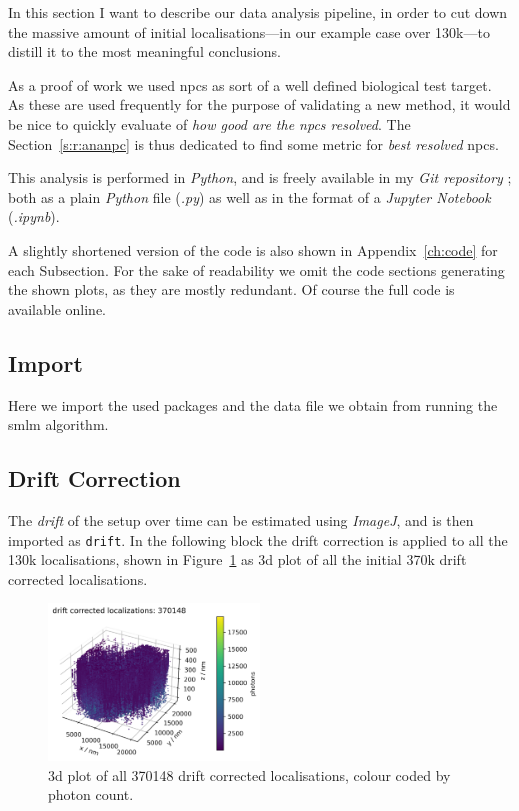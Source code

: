 \documentclass[11pt, a4paper, oneside, twocolumn]{report}
\renewcommand{\tt}{\texttt}
\newcommand{\e}{\emph}
\newcommand{\x}[1]{#1\index{#1}}
\begin{document}
In this section I want to describe our data analysis pipeline, in
order to cut down the massive amount of initial localisations---in our
example case over 130k---to distill it to the most meaningful
conclusions.

As a proof of work we used \gls{npc}s as sort of a well defined
biological test target. As these are used frequently for the purpose
of validating a new method, it would be nice to quickly evaluate of
\e{how good are the \gls{npc}s resolved}. The Section~\ref{s:r:ananpc}
is thus dedicated to find some metric for \e{best resolved}
\gls{npc}s.

This analysis is performed in \e{\x{Python}}, and is freely available
in my \e{Git repository} \cite{sie21}; both as a plain \e{Python} file
(\e{.py}) as well as in the format of a \e{\x{Jupyter Notebook}}
(\e{.ipynb}).

A slightly shortened version of the code is also shown in
Appendix~\ref{ch:code} for each Subsection. For the sake of
readability we omit the code sections generating the shown plots, as
they are mostly redundant. Of course the full code is available
online.


\subsection{Import}

Here we import the used packages and the data file we obtain from
running the \gls{smlm} algorithm.


\subsection{Drift Correction}

The \e{\x{drift}} of the setup over time can be estimated using
\e{ImageJ}, and is then imported as \tt{drift}. In the following block
the drift correction is applied to all the 130k localisations, shown
in Figure~\ref{f:2_drift} as 3d plot of all the initial 370k drift
corrected localisations.

\begin{figure}[h]
  \centering
  \includegraphics[width=0.5\textwidth]{2_drift.png}
  \caption{3d plot of all 370148 drift corrected localisations, colour
    coded by photon count.}
  \label{f:2_drift}
\end{figure}
\end{document}
